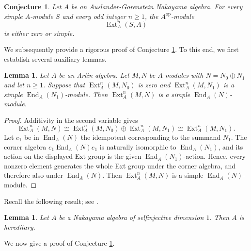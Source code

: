 \documentclass[a4paper,reqno]{amsart}
\numberwithin{equation}{section}
\theoremstyle{plain}
\newtheorem{lem}[thm]{Lemma}
\newtheorem{conj}[thm]{Conjecture}
\theoremstyle{definition}
\theoremstyle{remark}
\DeclareMathOperator{\Ext}{Ext}
\DeclareMathOperator{\End}{End}
\DeclareMathOperator{\op}{op}
\renewcommand{\-}{\mbox{-}}
\begin{document}
\begin{conj} \label{conj:kkm}
Let \(A\) be an Auslander-Gorenstein Nakayama algebra.
For every simple \(A\)-module \(S\) and every odd integer \(n\ge 1\), 
the \(A^{\op}\)-module
\[\Ext_A^n(S,A)\] 
is either zero or simple.
\end{conj}

We subsequently provide a rigorous proof of Conjecture \ref{conj:kkm}. 
To this end, we first establish several auxiliary lemmas.


\begin{lem}\label{lem:simple}
Let \(A\) be an Artin algebra.
Let \(M,N\) be \(A\)-modules with \(N=N_0\oplus N_1\) and let  \(n\ge 1\).
Suppose that  \(\Ext^n_A(M,N_0)\) is zero and  \(\Ext^n_A(M,N_1)\) is a simple \(\End_A(N_1)\)-module.
Then \(\Ext^n_A(M,N)\) is a simple  \(\End_A(N)\)-module.
\end{lem}


\begin{proof}
Additivity in the second variable gives
\[
  \Ext_A^n(M,N)\cong
  \Ext_A^n(M,N_0)\oplus\Ext_A^n(M,N_1)
  \cong \Ext_A^n(M,N_1).
\]
Let $e_1$ be in $\End_A(N)$  the idempotent corresponding to the summand $N_1$.
The corner algebra $e_1\End_A(N)e_1$ is naturally isomorphic to
$\End_A(N_1)$, and its action on the displayed Ext group is the given
$\End_A(N_1)$-action. 
Hence, every nonzero element generates the whole Ext
group under the corner algebra, and therefore also under $\End_A(N)$.
Then $\Ext_A^n(M,N)$ is a simple  $\End_A(N)$-module.
\end{proof}





Recall the following result; see \cite{Sen19}. 

\begin{lem} \label{lem:injdim1} 
    Let \(A\) be a Nakayama algebra of selfinjective dimension $1$. 
    Then \(A\) is hereditary.
\end{lem}


We now give a proof of Conjecture \ref{conj:kkm}.
\end{document}
